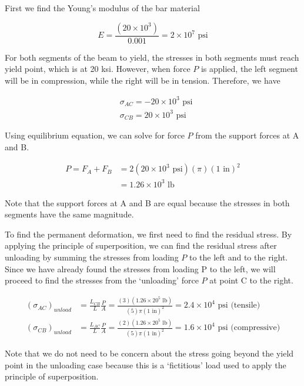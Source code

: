 \documentclass[
10pt,
a4paper,
openany,
svgnames,
]{book} %
\begin{document}
\begin{solution}
  
  First we find the Young’s modulus of the bar material
  
  \[E = \frac{{(20 \times {{10}^3})}}{{0.001}} = 2 \times {10^7} \text{ psi}\]	
  
  For both segments of the beam to yield, the stresses in both segments must reach yield point, which is at 20 ksi. However, when force $P$ is applied, the left segment will be in compression, while the right will be in tension. Therefore, we have
  
  \begin{align*}
    &{\sigma _{AC}} =  - 20 \times {10^3} \text{ psi} \\
    &{\sigma _{CB}} = 20 \times {10^3} \text{ psi}
  \end{align*}	

  Using equilibrium equation, we can solve for force $P$ from the support forces at A and B.
  
  \begin{align*}
    P = {F_A} + {F_B} &= 2(20 \times {10^3} \text{ psi})(\pi ){(1 \text{ in})^2} \\ 
                      &= 1.26 \times {10^3} \text{ lb}
  \end{align*}	
  
  Note that the support forces at A and B are equal because the stresses in both segments have the same magnitude.
  
  To find the permanent deformation, we first need to find the residual stress. By applying the principle of superposition, we can find the residual stress after unloading by summing the stresses from loading $P$ to the left and to the right. Since we have already found the stresses from loading P to the left, we will proceed to find the stresses from the ‘unloading’ force $P$ at point C to the right.
  
  \begin{align*}
    {({\sigma _{AC}})_{unload}} &= \frac{{{L_{CB}}}}{L}\frac{P}{A} = \frac{{(3)(1.26 \times {{20}^5} \text{ lb})}}{{(5)\pi {{(1 \text{ in})}^2}}} = 2.4 \times {10^4} \text{ psi} \text{ (tensile)} \\
  {({\sigma _{CB}})_{unload}} &= \frac{{{L_{AC}}}}{L}\frac{P}{A} = \frac{{(2)(1.26 \times {{20}^5} \text{ lb})}}{{(5)\pi {{(1 \text{ in})}^2}}} = 1.6 \times {10^4} \text{ psi} \text{ (compressive)}
  \end{align*}	
  
  Note that we do not need to be concern about the stress going beyond the yield point in the unloading case because this is a ‘fictitious’ load used to apply the principle of superposition.
  

\end{solution}
\end{document}

